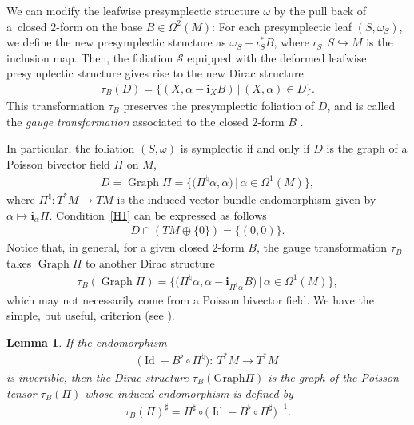 \documentclass[10pt,a4paper]{amsart}
\numberwithin{equation}{section}
\newtheorem{Lemma}[Theorem]{Lemma}
\begin{document}
We can modify the leafwise presymplectic structure $\omega$ by the pull back of a~closed $2$-form on the base $B\in\Omega^{2}(M)$: For each presymplectic leaf $(S,\omega_{S})$, we def\/ine the new presymplectic structure as $\omega_{S}+\iota_{S}^{\ast}B$, where $\iota_{S}\colon S\hookrightarrow M$ is the inclusion map. Then, the foliation $\mathcal{S}$ equipped with the deformed leafwise presymplectic structure gives rise to the new Dirac structure
\begin{gather*}
\tau_{B}(D)=\{(X,\alpha-\mathbf{i}_{X}B)\,|\,(X,\alpha)\in D\}.
\end{gather*}
This transformation $\tau_{B}$ preserves the presymplectic foliation of $D$, and is called the \emph{gauge transformation} associated to the closed $2$-form $B$ \cite{BurRa-03, SeWe-01}.

In particular, the foliation $(S,\omega)$ is symplectic if and only if $D$ is the graph of a Poisson bivector f\/ield $\Pi$ on $M$,
\begin{gather}
D=\operatorname*{Graph}\Pi=\big\{\big(\Pi^{\natural}\alpha,\alpha\big)\,|\,\alpha\in\Omega^{1}(M)\big\}, \label{H1}
\end{gather}
where $\Pi^{\natural}\colon T^{\ast}M\rightarrow TM$ is the induced vector bundle endomorphism given by $\alpha\mapsto\mathbf{i}_{\alpha}\Pi$. Condition~\eqref{H1} can be expressed as follows
\begin{gather*}
D\cap  ( TM\oplus\{0\} ) =\{(0,0)\}.
\end{gather*}
Notice that, in general, for a given closed $2$-form $B$, the gauge transformation $\tau_{B}$ takes $\operatorname*{Graph}\Pi$ to another Dirac structure
\begin{gather*}
\tau_{B}(\operatorname*{Graph}\Pi)=\big\{\big(\Pi^{\natural}\alpha,\alpha-\mathbf{i}_{\Pi^{\natural}\alpha}B\big)\,|\,\alpha\in\Omega^{1}(M)\big\},
\end{gather*}
which may not necessarily come from a Poisson bivector f\/ield. We have the simple, but useful, criterion (see \cite[pp.~5--6]{SeWe-01}).

\begin{Lemma}\label{lem21}
If the endomorphism
\begin{gather*}
\big( \operatorname{Id}-B^{\flat}\circ\Pi^{\natural}\big) \colon \ T^{\ast }M\rightarrow T^{\ast}M
\end{gather*}
is invertible, then the Dirac structure $\tau_{B}(\mathrm{Graph}\Pi)$ is the graph of the Poisson tensor $\tau_{B}(\Pi)$ whose induced endomorphism is
defined by
\begin{gather*}
\tau_{B}(\Pi)^{\sharp}=\Pi^{\sharp}\circ\big(\operatorname{Id}-B^{\flat}\circ \Pi^{\sharp}\big)^{-1}.
\end{gather*}
\end{Lemma}
\end{document}
